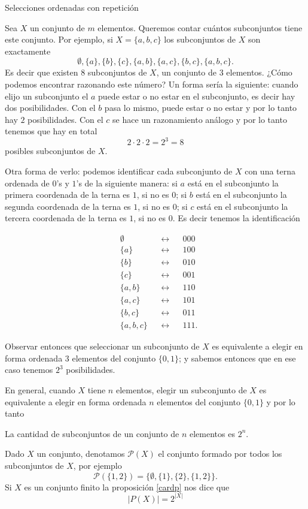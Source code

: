 \begin{section}{Selecciones ordenadas con repetición}
 

\begin{ejemplo*} Sea $X$ un conjunto de $m$ elementos. Queremos contar cuántos subconjuntos tiene este conjunto. 
Por ejemplo, si $X = \{ a, b, c \}$ los subconjuntos de $X$ son exactamente
$$
\emptyset, \{ a \} , \{ b \}, \{ c \}, \{ a, b \}, \{ a, c \}, \{ b, c \}, \{ a, b, c\}.
$$ 
Es decir que existen $8$ subconjuntos de $X$, un conjunto de $3$ elementos. ¿Cómo podemos encontrar razonando este número? Un forma sería la siguiente:  cuando elijo un subconjunto el $a$ puede estar o no estar en el subconjunto, es decir hay dos posibilidades. Con el $b$ pasa lo mismo, puede estar o no estar y por lo tanto hay $2$ posibilidades. Con el $c$ se hace un razonamiento análogo y por lo tanto tenemos que hay en total 
$$
2 \cdot 2 \cdot 2 = 2^3 = 8
$$
posibles subconjuntos de $X$.  

Otra forma de verlo: podemos identificar  cada subconjunto de  $X$ con una terna ordenada de $0$'s y $1$'s de la siguiente manera: si $a$ está en el subconjunto la primera coordenada de la terna es $1$, si no es $0$;  si $b$ está en el subconjunto la segunda coordenada de la terna es $1$, si no es $0$;  si $c$ está en el subconjunto la tercera coordenada de la terna es $1$, si no es $0$. Es decir tenemos la identificación



\begin{align*}
&\emptyset& &\leftrightarrow& &000 \\ 
&\{ a \} & &\leftrightarrow& &100 \\ 
&\{ b \}& &\leftrightarrow& &010 \\ 
&\{ c \}& &\leftrightarrow& &001 \\ 
&\{ a, b \}& &\leftrightarrow& &110 \\ 
&\{ a, c \}& &\leftrightarrow& &101 \\ 
&\{ b, c \}& &\leftrightarrow& &011 \\ 
&\{ a, b, c\}& &\leftrightarrow& &111 .
\end{align*}
 
Observar entonces que seleccionar un subconjunto de $X$ es equivalente a elegir en forma ordenada $3$ elementos del conjunto $\{ 0, 1 \}$; y sabemos entonces que en ese caso tenemos $2^3$ posibilidades. 

En general, cuando $X$ tiene $n$ elementos, 
elegir un subconjunto de $X$ es  equivalente a elegir en forma 
ordenada $n$ elementos del conjunto $\{ 0, 1 \}$ y por lo tanto

\begin{proposicion}\label{cardp} La cantidad de subconjuntos de  
un conjunto de $n$ elementos es $2^n$.
\end{proposicion}

Dado  $X$ un conjunto, denotamos $\mathcal P(X)$ el  conjunto  formado por todos los subconjuntos de $X$, por ejemplo
$$
\mathcal P(\{1,2\}) = \{\emptyset,\{1\},\{2\},\{1,2\}\}.
$$  
Si $X$ es un conjunto finito la proposición \ref{cardp} nos dice que
$$
\mathcal |P(X)| = 2^{|X|}
$$
\end{ejemplo*}

\end{section}

